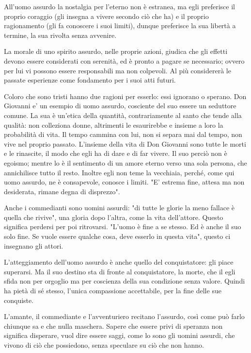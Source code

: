 \documentclass[a4paper,12pt,oneside]{article}%
\begin{document}
All'uomo assurdo la nostalgia per l'eterno non
è estranea, ma egli preferisce il proprio coraggio
(gli insegna a vivere secondo ciò che ha) e il proprio
ragionamento (gli fa conoscere i suoi limiti), dunque
preferisce la sua libertà a termine, la sua rivolta
senza avvenire.

La morale di uno spirito assurdo, nelle proprie
azioni, giudica che gli effetti devono essere
considerati con serenità, ed è pronto a pagare
se necessario; ovvero per lui vi possono essere
responsabili ma non colpevoli. Al più considererà
le passate esperienze come fondamento per i
suoi atti futuri.

Coloro che sono tristi hanno due ragioni per esserlo:
essi ignorano o sperano.
Don Giovanni e' un esempio di uomo assurdo,
cosciente del suo essere un seduttore comune. La
sua è un'etica della quantità, contrariamente
al santo che tende alla qualità: non colleziona
donne, altrimenti le esaurirebbe e insieme a
loro la probabilità di vita. Il tempo cammina
con lui, non si separa mai dal tempo, non vive nel
proprio passato.
L'insieme della vita di Don Giovanni sono tutte
le morti e le rinascite, il modo che egli ha di
dare e di far vivere. Il suo perciò non è egoismo;
mentre lo è il sentimento di un amore eterno
verso una sola persona, che annichilisce tutto il
resto. Inoltre egli non teme la vecchiaia, perché,
come qui uomo assurdo, ne è consapevole, conosce
i limiti. "E' estrema fine, attesa ma non desiderata,
rimane degna di disprezzo".

Anche i commedianti sono uomini assurdi: "di tutte le glorie la meno fallace è quella che
rivive", una gloria dopo l'altra, come la vita
dell'attore. Questo significa perdersi per poi
ritrovarsi.
"L'uomo è fine a se stesso. Ed è anche il suo solo
fine. Se vuole essere qualche cosa, deve esserlo in
questa vita", questo ci insegnano gli attori.

L'atteggiamento dell'uomo assurdo è anche
quello del conquistatore: gli piace superarsi. Ma il
suo destino sta di fronte al conquistatore, la morte,
che il egli sfida non per orgoglio ma
per coscienza della sua condizione senza valore.
Quindi ha pietà di sé stesso, l'unica compassione
accettabile, per la fine delle sue conquiste.

L'amante, il commediante e l'avventuriero recitano
l'assurdo, così come può farlo chiunque sa
e che nulla maschera. Sapere che essere privi di
speranza non significa disperare, vuol dire essere
saggi, come lo sono gli uomini assurdi, che vivono
di ciò che possiedono, senza speculare su ciò che
non hanno.



	
	
	
\end{document}
